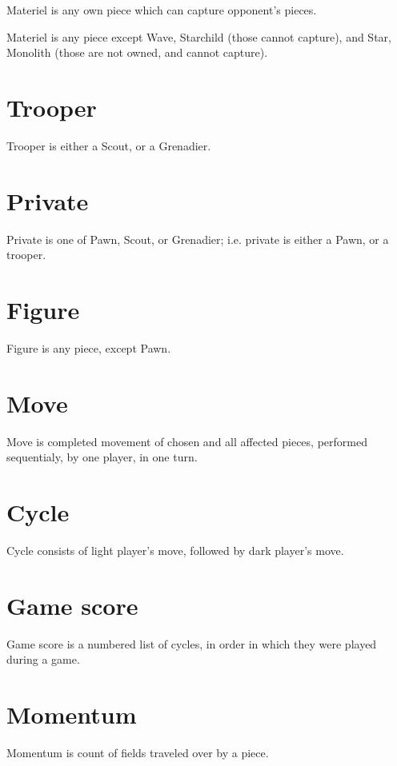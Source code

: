 Materiel is any own piece which can capture opponent's pieces.

Materiel is any piece except Wave, Starchild (those cannot capture),
and Star, Monolith (those are not owned, and cannot capture).

\section*{Trooper}
\label{sec:Terms/Trooper}
Trooper is either a Scout, or a Grenadier.

\section*{Private}
\label{sec:Terms/Private}
Private is one of Pawn, Scout, or Grenadier; i.e. private is either a Pawn,
or a trooper.

\section*{Figure}
\label{sec:Terms/Figure}
Figure is any piece, except Pawn.

\section*{Move}
\label{sec:Terms/Move}
Move is completed movement of chosen and all affected pieces, performed
sequentialy, by one player, in one turn.

\section*{Cycle}
\label{sec:Terms/Cycle}
Cycle consists of light player's move, followed by dark player's move.

\section*{Game score}
\label{sec:Terms/Game score}
Game score is a numbered list of cycles, in order in which they were played
during a game.

\section*{Momentum}
\label{sec:Terms/Momentum}
Momentum is count of fields traveled over by a piece.

